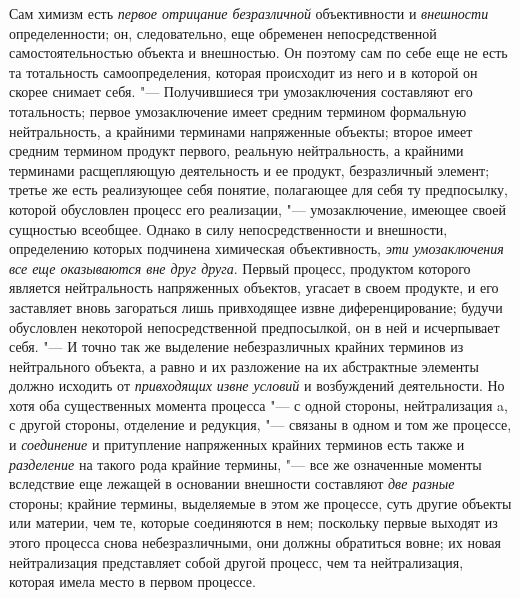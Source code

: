 {{Сам химизм есть {\em первое
отрицание безразличной} объективности и
{\em внешности}
определенности; он, следовательно, еще обременен
непосредственной самостоятельностью объекта и внешностью. Он поэтому сам по
себе еще не есть та тотальность самоопределения, которая происходит из него
и в которой он скорее снимает себя. "--- Получившиеся три
умозаключения составляют его тотальность; первое умозаключение имеет
средним термином формальную нейтральность, а крайними терминами напряженные
объекты; второе имеет средним термином продукт первого, реальную
нейтральность, а крайними терминами расщепляющую деятельность и ее продукт,
безразличный элемент; третье же есть реализующее себя понятие, полагающее
для себя ту предпосылку, которой обусловлен процесс его реализации, "---
умозаключение, имеющее своей сущностью всеобщее. Однако в
силу непосредственности и внешности, определению которых подчинена
химическая объективность, {\em эти
умозаключения все еще оказываются вне друг друга}. Первый
процесс, продуктом которого является нейтральность напряженных объектов,
угасает в своем продукте, и его заставляет вновь загораться лишь
привходящее извне диференцирование; будучи обусловлен некоторой
непосредственной предпосылкой, он в ней и исчерпывает себя. "---
И точно так же выделение небезразличных крайних терминов из
нейтрального объекта, а равно и их разложение на их абстрактные элементы
должно исходить от {\em привходящих
извне условий} и возбуждений деятельности. Но хотя оба
существенных момента процесса "--- с одной стороны,
нейтрализация a, с другой стороны, отделение и редукция, "---
связаны в одном и том же процессе, и
{\em соединение} и
притупление напряженных крайних терминов есть также и
{\em разделение} на
такого рода крайние термины, "--- все же означенные моменты
вследствие еще лежащей в основании внешности составляют
{\em две разные} стороны;
крайние термины, выделяемые в этом же процессе, суть другие объекты или
материи, чем те, которые соединяются в нем; поскольку первые выходят из
этого процесса снова небезразличными, они должны обратиться
вовне; их новая нейтрализация представляет собой другой процесс, чем та
нейтрализация, которая имела место в первом процессе.

}}
